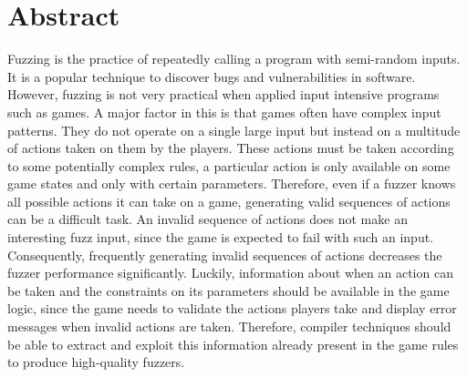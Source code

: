 \documentclass{Configuration_Files/PoliMi3i_thesis}
\begin{document}


\pagestyle{empty} %
\frontmatter %


\pagebreak

\startpreamble
\setcounter{page}{1} %

\chapter*{Abstract} 
Fuzzing is the practice of repeatedly calling a program with semi-random inputs.
It is a popular technique to discover bugs and vulnerabilities in software.
However, fuzzing is not very practical when applied input intensive programs such as games.
A major factor in this is that games often have complex input patterns.
They do not operate on a single large input but instead on a multitude of actions taken on them by the players.
These actions must be taken according to some potentially complex rules, a particular action is only available on some game states and only with certain parameters.
Therefore, even if a fuzzer knows all possible actions it can take on a game, generating valid sequences of actions can be a difficult task.
An invalid sequence of actions does not make an interesting fuzz input, since the game is expected to fail with such an input.
Consequently, frequently generating invalid sequences of actions decreases the fuzzer performance significantly.
Luckily, information about when an action can be taken and the constraints on its parameters should be available in the game logic, since the game needs to validate the actions players take and display error messages when invalid actions are taken.
Therefore, compiler techniques should be able to extract and exploit this information already present in the game rules to produce high-quality fuzzers.
\end{document}
